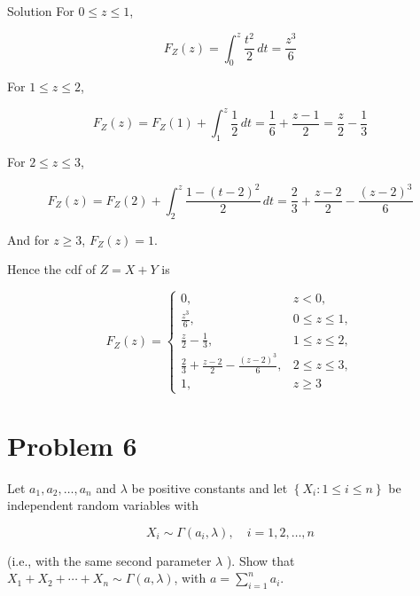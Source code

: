\documentclass{qlnotes-export}
\begin{document}
\begin{qlsolution}{Solution}
For \(0 \leq z \leq 1\),

\[F_{Z}(z) = \int_{0}^{z}\frac{t^{2}}{2}\, dt = \frac{z^{3}}{6}\]

For \(1 \leq z \leq 2\),

\[F_{Z}(z) = F_{Z}(1) + \int_{1}^{z}\frac{1}{2}\, dt = \frac{1}{6} + \frac{z - 1}{2} = \frac{z}{2} - \frac{1}{3}\]

For \(2 \leq z \leq 3\),

\[F_{Z}(z) = F_{Z}(2) + \int_{2}^{z}\frac{1 - (t - 2)^{2}}{2}\, dt = \frac{2}{3} + \frac{z - 2}{2} - \frac{(z - 2)^{3}}{6}\]

And for \(z \geq 3\), \(F_{Z}(z) = 1\).

Hence the cdf of \(Z = X + Y\) is

\[F_{Z}(z) = \left\{ \begin{matrix}
{0,} & {z < 0,} \\
{\frac{z^{3}}{6},} & {0 \leq z \leq 1,} \\
{\frac{z}{2} - \frac{1}{3},} & {1 \leq z \leq 2,} \\
{\frac{2}{3} + \frac{z - 2}{2} - \frac{(z - 2)^{3}}{6},} & {2 \leq z \leq 3,} \\
{1,} & {z \geq 3}
\end{matrix} \right.\]

\end{qlsolution}

\section{Problem 6}\label{problem-6-4}

Let \(a_{1},a_{2},\ldots,a_{n}\) and \(\lambda\) be positive constants and let \(\left\{ {X_{i}:1 \leq i \leq n} \right\}\) be independent random variables with

\[X_{i} \sim \Gamma\left( {a_{i},\lambda} \right),\quad i = 1,2,\ldots,n\]

(i.e., with the same second parameter \(\lambda\) ). Show that \(X_{1} + X_{2} + \cdots + X_{n} \sim \Gamma(a,\lambda)\), with \(a = \sum_{i = 1}^{n}a_{i}\).
\end{document}
